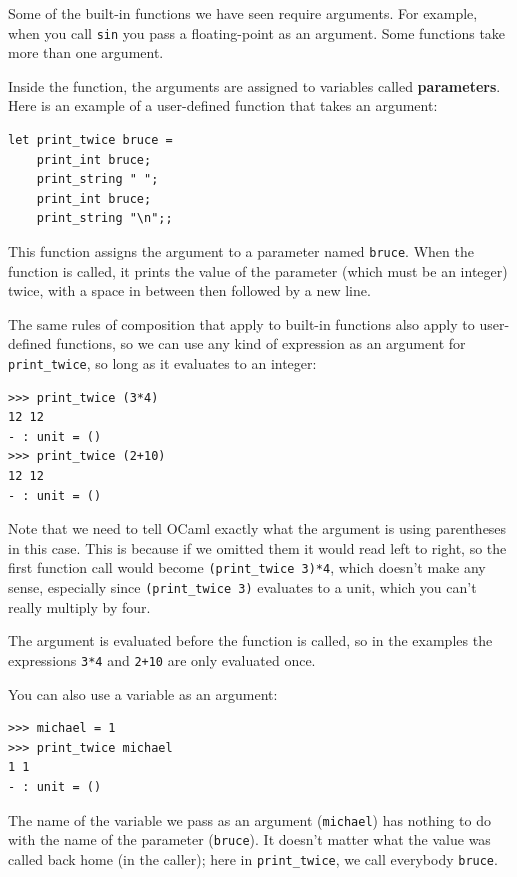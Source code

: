 \documentclass[10pt]{book}
\begin{document}
Some of the built-in functions we have seen require arguments.  For
example, when you call {\tt sin} you pass a floating-point
as an argument.  Some functions take more than one argument.

Inside the function, the arguments are assigned to
variables called {\bf parameters}.  Here is an example of a
user-defined function that takes an argument:


\beforeverb
\begin{verbatim}
let print_twice bruce =
	print_int bruce;
	print_string " ";
	print_int bruce;
	print_string "\n";;
\end{verbatim}
\afterverb
%
This function assigns the argument to a parameter
named {\tt bruce}.  When the function is called, it prints the value of
the parameter (which must be an integer) twice, with a space in between then
followed by a new line.

The same rules of composition that apply to built-in functions also
apply to user-defined functions, so we can use any kind of expression
as an argument for \verb"print_twice", so long as it evaluates to an integer:


\beforeverb
\begin{verbatim}
>>> print_twice (3*4)
12 12
- : unit = ()
>>> print_twice (2+10)
12 12
- : unit = ()
\end{verbatim}
\afterverb
%
Note that we need to tell OCaml exactly what the argument is using parentheses in this case.
This is because if we omitted them it would read left to right, so the first function call 
would become {\tt (\verb"print_twice" 3)*4}, which doesn't make any sense, especially since
{\tt (\verb"print_twice" 3)} evaluates to a unit, which you can't really multiply by four.

The argument is evaluated before the function is called, so
in the examples the expressions {\tt 3*4} and
{\tt 2+10} are only evaluated once.


You can also use a variable as an argument:

\beforeverb
\begin{verbatim}
>>> michael = 1
>>> print_twice michael
1 1
- : unit = ()
\end{verbatim}
\afterverb
%
The name of the variable we pass as an argument ({\tt michael}) has
nothing to do with the name of the parameter ({\tt bruce}).  It
doesn't matter what the value was called back home (in the caller);
here in \verb"print_twice", we call everybody {\tt bruce}.
\end{document}
